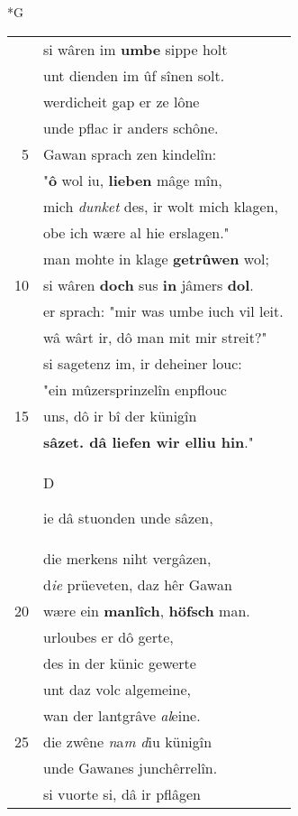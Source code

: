\documentclass[8pt,a4paper,notitlepage]{article}
\begin{document}
\newpage
\begin{table}[ht]
\begin{minipage}[t]{0.5\linewidth}
\small
\begin{center}*G
\end{center}
\begin{tabular}{rl}
 & si wâren im \textbf{umbe} sippe holt\\ 
 & unt dienden im ûf sînen solt.\\ 
 & werdicheit gap er ze lône\\ 
 & unde pflac ir anders schône.\\ 
5 & Gawan sprach zen kindelîn:\\ 
 & "\textbf{ô} wol iu, \textbf{lieben} mâge mîn,\\ 
 & mich \textit{dunket} des, ir wolt mich klagen,\\ 
 & obe ich wære al hie erslagen."\\ 
 & man mohte in klage \textbf{getrûwen} wol;\\ 
10 & si wâren \textbf{doch} sus \textbf{in} jâmers \textbf{dol}.\\ 
 & er sprach: "mir was umbe iuch vil leit.\\ 
 & wâ wârt ir, dô man mit mir streit?"\\ 
 & si sagetenz im, ir deheiner louc:\\ 
 & "ein mûzersprinzelîn enpflouc\\ 
15 & uns, dô ir bî der künigîn\\ 
 & \textbf{sâzet. dâ liefen wir elliu hin}."\\ 
 & \begin{large}D\end{large}ie dâ stuonden unde sâzen,\\ 
 & die merkens niht vergâzen,\\ 
 & d\textit{ie} prüeveten, daz hêr Gawan\\ 
20 & wære ein \textbf{manlîch}, \textbf{höfsch} man.\\ 
 & urloubes er dô gerte,\\ 
 & des in der künic gewerte\\ 
 & unt daz volc algemeine,\\ 
 & wan der lantgrâve \textit{al}eine.\\ 
25 & die zwêne \textit{n}a\textit{m d}iu künigîn\\ 
 & unde Gawanes junchêrrelîn.\\ 
 & si vuorte si, dâ ir pflâgen\\ 

\end{tabular}
\end{minipage}
\end{table}
\end{document}
